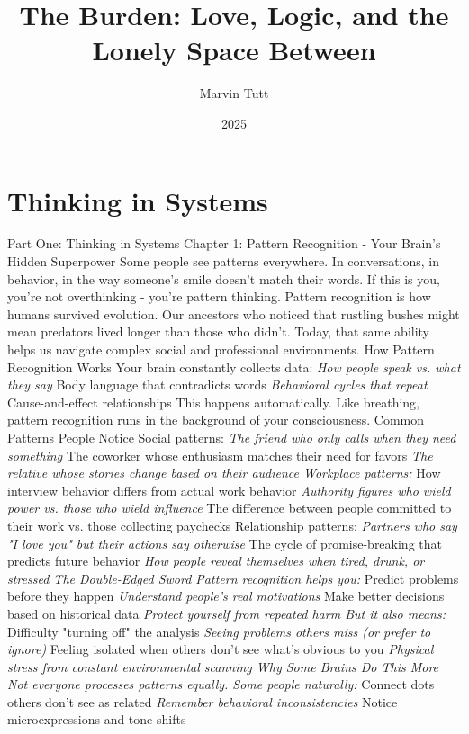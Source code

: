 \documentclass[12pt]{book}
\title{The Burden: Love, Logic, and the Lonely Space Between}
\author{Marvin Tutt}
\date{2025}
\begin{document}
\maketitle
\tableofcontents

\part{Thinking in Systems}
Part One: Thinking in Systems
Chapter 1: Pattern Recognition - Your Brain's Hidden Superpower
Some people see patterns everywhere. In conversations, in behavior, in the way someone's smile doesn't match their words. If this is you, you're not overthinking - you're pattern thinking.
Pattern recognition is how humans survived evolution. Our ancestors who noticed that rustling bushes might mean predators lived longer than those who didn't. Today, that same ability helps us navigate complex social and professional environments.
How Pattern Recognition Works
Your brain constantly collects data:
\textit{ How people speak vs. what they say
} Body language that contradicts words
\textit{ Behavioral cycles that repeat
} Cause-and-effect relationships
This happens automatically. Like breathing, pattern recognition runs in the background of your consciousness.
Common Patterns People Notice
Social patterns:
\textit{ The friend who only calls when they need something
} The coworker whose enthusiasm matches their need for favors
\textit{ The relative whose stories change based on their audience
Workplace patterns:
} How interview behavior differs from actual work behavior
\textit{ Authority figures who wield power vs. those who wield influence
} The difference between people committed to their work vs. those collecting paychecks
Relationship patterns:
\textit{ Partners who say "I love you" but their actions say otherwise
} The cycle of promise-breaking that predicts future behavior
\textit{ How people reveal themselves when tired, drunk, or stressed
The Double-Edged Sword
Pattern recognition helps you:
} Predict problems before they happen
\textit{ Understand people's real motivations
} Make better decisions based on historical data
\textit{ Protect yourself from repeated harm
But it also means:
} Difficulty "turning off" the analysis
\textit{ Seeing problems others miss (or prefer to ignore)
} Feeling isolated when others don't see what's obvious to you
\textit{ Physical stress from constant environmental scanning
Why Some Brains Do This More
Not everyone processes patterns equally. Some people naturally:
} Connect dots others don't see as related
\textit{ Remember behavioral inconsistencies
} Notice microexpressions and tone shifts
\end{document}
